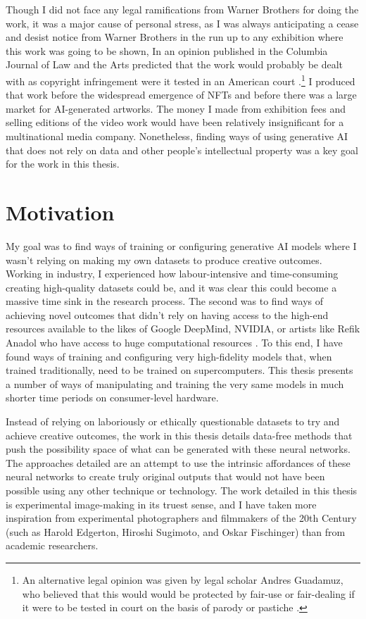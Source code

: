 Though I did not face any legal ramifications from Warner Brothers for doing the work, it was a major cause of personal stress, as I was always anticipating a cease and desist notice from Warner Brothers in the run up to any exhibition where this work was going to be shown,
In an opinion published in the Columbia Journal of Law and the Arts predicted that the work would probably be dealt with as copyright infringement were it tested in an American court \citep{sobel2017artificial}.\footnote{An alternative legal opinion was given by legal scholar Andres Guadamuz, who believed that this would would be protected by fair-use or fair-dealing if it were to be tested in court on the basis of parody or pastiche \citep{guadamuz2024personal}.} 
I produced that work before the widespread emergence of NFTs and before there was a large market for AI-generated artworks. 
The money I made from exhibition fees and selling editions of the video work would have been relatively insignificant for a multinational media company. 
Nonetheless, finding ways of using generative AI that does not rely on data and other people's intellectual property was a key goal for the work in this thesis.

\section{Motivation}

My goal was to find ways of training or configuring generative AI models where I wasn’t relying on making my own datasets to produce creative outcomes. 
Working in industry, I experienced how labour-intensive and time-consuming creating high-quality datasets could be, and it was clear this could become a massive time sink in the research process. 
The second was to find ways of achieving novel outcomes that didn’t rely on having access to the high-end resources available to the likes of Google DeepMind, NVIDIA, or artists like Refik Anadol who have access to huge computational resources \citep{caulfield2022refik}. 
To this end, I have found ways of training and configuring very high-fidelity models that, when trained traditionally, need to be trained on supercomputers. 
This thesis presents a number of ways of manipulating and training the very same models in much shorter time periods on consumer-level hardware. 

Instead of relying on laboriously or ethically questionable datasets to try and achieve creative outcomes, the work in this thesis details data-free methods that push the possibility space of what can be generated with these neural networks. 
The approaches detailed are an attempt to use the intrinsic affordances of these neural networks to create truly original outputs that would not have been possible using any other technique or technology. 
The work detailed in this thesis is experimental image-making in its truest sense, and I have taken more inspiration from experimental photographers and filmmakers of the 20th Century (such as Harold Edgerton, Hiroshi Sugimoto, and Oskar Fischinger) than from academic researchers.

